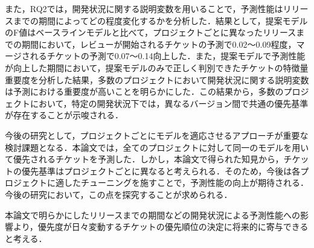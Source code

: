 \documentclass[submit]{ipsj}
\begin{document}
また，RQ2では，開発状況に関する説明変数を用いることで，予測性能はリリースまでの期間によってどの程度変化するかを分析した．結果として，提案モデルのF値はベースラインモデルと比べて，プロジェクトごとに異なったリリースまでの期間において，レビューが開始されるチケットの予測で0.02〜0.09程度，マージされるチケットの予測で0.07〜0.14向上した．また，提案モデルで予測性能が向上した期間において，提案モデルのみで正しく判別できたチケットの特徴量重要度を分析した結果，多数のプロジェクトにおいて開発状況に関する説明変数は予測における重要度が高いことを明らかにした．この結果から，多数のプロジェクトにおいて，特定の開発状況下では，異なるバージョン間で共通の優先基準が存在することが示唆される．

今後の研究として，プロジェクトごとにモデルを適応させるアプローチが重要な検討課題となる．本論文では，全てのプロジェクトに対して同一のモデルを用いて優先されるチケットを予測した．しかし，本論文で得られた知見から，チケットの優先基準はプロジェクトごとに異なると考えられる．そのため，今後は各プロジェクトに適したチューニングを施すことで，予測性能の向上が期待される．今後の研究において，この点を探究することが求められる．

本論文で明らかにしたリリースまでの期間などの開発状況による予測性能への影響より，優先度が日々変動するチケットの優先順位の決定に将来的に寄与できると考える．







\vspace{-4mm}

\begin{biography}
%
\end{biography}
\end{document}
